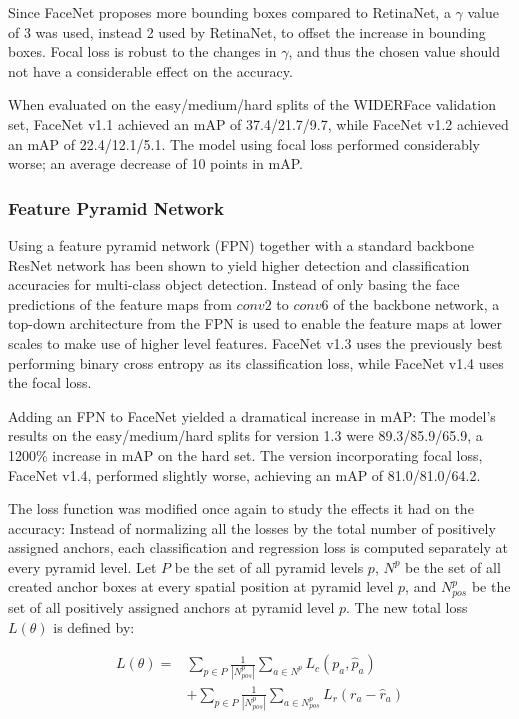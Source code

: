 \documentclass[paperwidth=48in,paperheight=48in, fontscale=0.4166666666666, landscape]{baposter}
\begin{document}
\begin{poster}
{Since FaceNet proposes more bounding boxes compared to RetinaNet, a $\gamma$ value of 3 was used, instead 2 used by RetinaNet, to offset the increase in bounding boxes. Focal loss is robust to the changes in $\gamma$, and thus the chosen value should not have a considerable effect on the accuracy.

When evaluated on the easy/medium/hard splits of the WIDERFace validation set, FaceNet v1.1 achieved an mAP of 37.4/21.7/9.7, while FaceNet v1.2 achieved an mAP of 22.4/12.1/5.1. The model using focal loss performed considerably worse; an average decrease of 10 points in mAP.

\subsubsection{Feature Pyramid Network}
Using a feature pyramid network (FPN) together with a standard backbone ResNet network has been shown to yield higher detection and classification accuracies \cite{fpn} \cite{retinanet} for multi-class object detection. Instead of only basing the face predictions of the feature maps from $conv2$ to $conv6$ of the backbone network, a top-down architecture from the FPN is used to enable the feature maps at lower scales to make use of higher level features. FaceNet v1.3 uses the previously best performing binary cross entropy as its classification loss, while FaceNet v1.4 uses the focal loss.

Adding an FPN to FaceNet yielded a dramatical increase in mAP: The model's results on the easy/medium/hard splits for version 1.3 were 89.3/85.9/65.9, a 1200\% increase in mAP on the hard set. The version incorporating focal loss, FaceNet v1.4, performed slightly worse, achieving an mAP of 81.0/81.0/64.2.

The loss function was modified once again to study the effects it had on the accuracy: Instead of normalizing all the losses by the total number of positively assigned anchors, each classification and regression loss is computed separately at every pyramid level. Let $P$ be the set of all pyramid levels $p$, $N^p$ be the set of all created anchor boxes at every spatial position at pyramid level $p$, and $N^p_{pos}$ be the set of all positively assigned anchors at pyramid level $p$. The new total loss $L(\theta)$ is defined by:

\begin{equation}
\begin{split}
	L(\theta) = & \sum_{p \in P} \frac{1}{|N^p_{pos}|} \sum_{a \in N^p} L_c(p_a, \hat{p}_a) \\
	 & + \sum_{p \in P}  \frac{1}{|N^p_{pos}|} \sum_{a \in N^p_{pos}} L_r(r_a - \hat{r}_a)  \\ 
\end{split}
\end{equation}

}
\end{poster}
\end{document}
